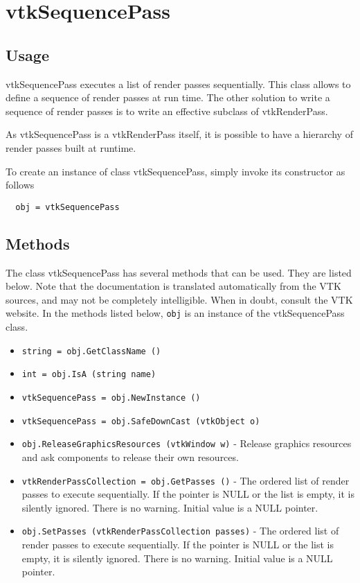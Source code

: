 \section{vtkSequencePass}

\subsection{Usage}

 vtkSequencePass executes a list of render passes sequentially.
 This class allows to define a sequence of render passes at run time.
 The other solution to write a sequence of render passes is to write an
 effective subclass of vtkRenderPass.

 As vtkSequencePass is a vtkRenderPass itself, it is possible to have a
 hierarchy of render passes built at runtime.

To create an instance of class vtkSequencePass, simply
invoke its constructor as follows
\begin{verbatim}
  obj = vtkSequencePass
\end{verbatim}
\subsection{Methods}

The class vtkSequencePass has several methods that can be used.
  They are listed below.
Note that the documentation is translated automatically from the VTK sources,
and may not be completely intelligible.  When in doubt, consult the VTK website.
In the methods listed below, \verb|obj| is an instance of the vtkSequencePass class.
\begin{itemize}
\item  \verb|string = obj.GetClassName ()|

\item  \verb|int = obj.IsA (string name)|

\item  \verb|vtkSequencePass = obj.NewInstance ()|

\item  \verb|vtkSequencePass = obj.SafeDownCast (vtkObject o)|

\item  \verb|obj.ReleaseGraphicsResources (vtkWindow w)| -  Release graphics resources and ask components to release their own
 resources.
 

\item  \verb|vtkRenderPassCollection = obj.GetPasses ()| -  The ordered list of render passes to execute sequentially.
 If the pointer is NULL or the list is empty, it is silently ignored.
 There is no warning.
 Initial value is a NULL pointer.

\item  \verb|obj.SetPasses (vtkRenderPassCollection passes)| -  The ordered list of render passes to execute sequentially.
 If the pointer is NULL or the list is empty, it is silently ignored.
 There is no warning.
 Initial value is a NULL pointer.

\end{itemize}
